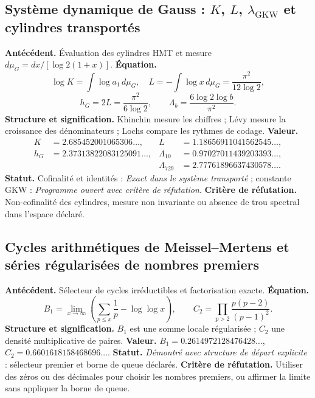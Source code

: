 \subsection*{Système dynamique de Gauss : \(K\), \(L\), \(\lambda_{\mathrm{GKW}}\) et cylindres transportés}
\textbf{Antécédent.} Évaluation des cylindres HMT et mesure
\(d\mu_G=dx/[\log2(1+x)]\). \textbf{Équation.}
\[
\log K=\int\log a_1\,d\mu_G,\quad
L=-\int\log x\,d\mu_G=\frac{\pi^2}{12\log2},
\]
\[
h_G=2L=\frac{\pi^2}{6\log2},\qquad
\Lambda_b=\frac{6\log2\log b}{\pi^2}.
\]
\textbf{Structure et signification.} Khinchin mesure les chiffres ; Lévy mesure la
croissance des dénominateurs ; Lochs compare les rythmes de codage.
\textbf{Valeur.}
\begin{align*}
K&=2.685452001065306\ldots,
&L&=1.18656911041562545\ldots,\\
h_G&=2.37313822083125091\ldots,
&\Lambda_{10}&=0.97027011439203393\ldots,\\
&&\Lambda_{729}&=2.77761896637430578\ldots.
\end{align*}
\textbf{Statut.} Cofinalité et identités : \emph{Exact dans le système
transporté} ; constante GKW : \emph{Programme ouvert avec critère de réfutation}.
\textbf{Critère de réfutation.} Non-cofinalité des cylindres, mesure non invariante ou absence
de trou spectral dans l'espace déclaré.

\subsection*{Cycles arithmétiques de Meissel--Mertens et séries régularisées de nombres premiers}
\textbf{Antécédent.} Sélecteur de cycles irréductibles et factorisation
exacte. \textbf{Équation.}
\[
B_1=\lim_{x\to\infty}\left(\sum_{p\le x}\frac1p-\log\log x\right),
\qquad
C_2=\prod_{p>2}\frac{p(p-2)}{(p-1)^2}.
\]
\textbf{Structure et signification.} \(B_1\) est une somme locale régularisée ;
\(C_2\) une densité multiplicative de paires. \textbf{Valeur.}
\(B_1=0.2614972128476428\ldots\),
\(C_2=0.6601618158468696\ldots\). \textbf{Statut.}
\emph{Démontré avec structure de départ explicite} : sélecteur premier et
borne de queue déclarés. \textbf{Critère de réfutation.} Utiliser des zéros ou des décimales pour choisir
les nombres premiers, ou affirmer la limite sans appliquer la borne de queue.

